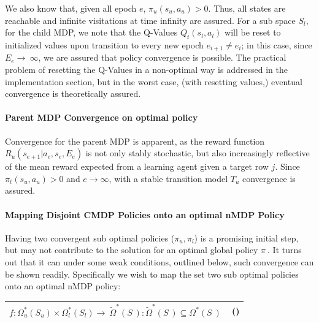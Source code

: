 \documentclass[]{article}
\let\oldparagraph\paragraph
\renewcommand{\paragraph}[1]{\oldparagraph{#1}\mbox{}}
\begin{document}
We also know that, given all epoch \(e\),
\(\pi_{u}\left( s_{u},a_{u} \right) > 0\). Thus, all states are
reachable and infinite visitations at time infinity are assured. For a
sub space \(S_{l}\), for the child MDP, we note that the Q-Values
\(Q_{t}(s_{l},a_{l})\) will be reset to initialized values upon
transition to every new epoch \(e_{i + 1} \neq e_{i}\); in this case,
since \(\overset{}{E_{e}} \rightarrow \ \infty\), we are assured that
policy convergence is possible. The practical problem of resetting the
Q-Values in a non-optimal way is addressed in the implementation
section, but in the worst case, (with resetting values,) eventual
convergence is theoretically assured.

\paragraph{Parent MDP Convergence on optimal
policy}\label{parent-mdp-convergence-on-optimal-policy}

Convergence for the parent MDP is apparent, as the reward function
\(R_{u}\left( s_{e + 1}|a_{e},s_{e},E_{e} \right)\) is not only stably
stochastic, but also increasingly reflective of the mean reward expected
from a learning agent given a target row \(j\). Since
\(\pi_{t}\left( s_{u},a_{u} \right) > 0\) and \(e \rightarrow \infty\),
with a stable transition model \(T_{u}\) convergence is assured.

\paragraph{Mapping Disjoint CMDP Policies onto an optimal nMDP
Policy}\label{mapping-disjoint-cmdp-policies-onto-an-optimal-nmdp-policy}

Having two convergent sub optimal policies (\(\pi_{u},\pi_{l}\)) is a
promising initial step, but may not contribute to the solution for an
optimal global policy \(\pi_{\ }.\) It turns out that it can under some
weak conditions, outlined below, such convergence can be shown readily.
Specifically we wish to map the set two sub optimal policies onto an
optimal nMDP policy:

\begin{longtable}[]{@{}ll@{}}
\toprule
\(f:\Omega_{u}^{*}\left( S_{u} \right) \times \Omega_{l}^{*}\left( S_{l} \right) \rightarrow \ {\tilde{\Omega}}_{\ }^{*}\left( S_{\ } \right):{\tilde{\Omega}}_{\ }^{*}\left( S_{\ } \right) \subseteq \Omega_{\ }^{*}\left( S_{\ } \right)\ \)
& ()\tabularnewline
\bottomrule
\end{longtable}
\end{document}
